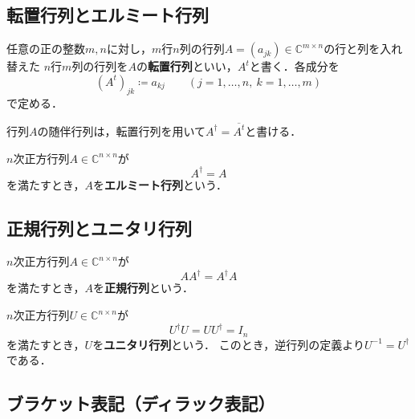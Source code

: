 \subsection{転置行列とエルミート行列}

\begin{defi}[転置行列]
  任意の正の整数$m,n$に対し，$m$行$n$列の行列$A=(a_{jk}) \in \mathbb{C}^{m\times n}$の行と列を入れ替えた
  $n$行$m$列の行列を$A$の\textbf{転置行列}といい，$A^t$と書く．各成分を
  \begin{equation*}
    (A^t)_{jk}\coloneq a_{kj}
    \qquad (j=1,\ldots,n,\ k=1,\ldots,m)
  \end{equation*}
  で定める．
\end{defi}

行列$A$の随伴行列は，転置行列を用いて$A^\dagger=\overline{A^t}$と書ける．

\begin{defi}[エルミート行列]
  $n$次正方行列$A\in\mathbb C^{n\times n}$が
  \begin{equation*}
    A^\dagger=A
  \end{equation*}
  を満たすとき，$A$を\textbf{エルミート行列}という．
\end{defi}

\subsection{正規行列とユニタリ行列}

\begin{defi}[正規行列]
  $n$次正方行列$A\in\mathbb C^{n\times n}$が
  \begin{equation*}
    AA^\dagger=A^\dagger A
  \end{equation*}
  を満たすとき，$A$を\textbf{正規行列}という．
\end{defi}

\begin{defi}[ユニタリ行列]
  \label{def:unitary-matrix-map}
  $n$次正方行列$U\in\mathbb C^{n\times n}$が
  \begin{equation*}
    U^\dagger U=UU^\dagger=I_n
  \end{equation*}
  を満たすとき，$U$を\textbf{ユニタリ行列}という．
  このとき，逆行列の定義より$U^{-1}=U^\dagger$である．
\end{defi}

\subsection{ブラケット表記（ディラック表記）}

